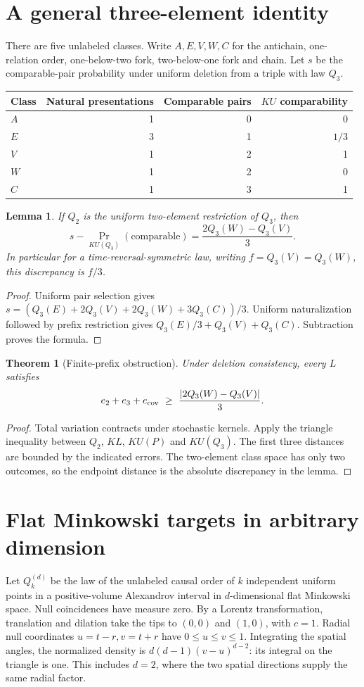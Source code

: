 \documentclass[11pt]{article}
\newtheorem{theorem}{Theorem}
\newtheorem{lemma}{Lemma}
\begin{document}
\section{A general three-element identity}
There are five unlabeled classes. Write $A,E,V,W,C$ for the antichain, one-relation order, one-below-two fork, two-below-one fork and chain. Let $s$ be the comparable-pair probability under uniform deletion from a triple with law $Q_3$.
\begin{center}
\begin{tabular}{lrrr}
\toprule
Class & Natural presentations & Comparable pairs & $K U$ comparability\\
\midrule
$A$ &1&0&0\\
$E$ &3&1&$1/3$\\
$V$ &1&2&1\\
$W$ &1&2&0\\
$C$ &1&3&1\\
\bottomrule
\end{tabular}
\end{center}
\begin{lemma}
If $Q_2$ is the uniform two-element restriction of $Q_3$, then
\[
s-\Pr_{KU(Q_3)}(\text{comparable})=\frac{2Q_3(W)-Q_3(V)}3.
\]
In particular for a time-reversal-symmetric law, writing $f=Q_3(V)=Q_3(W)$, this discrepancy is $f/3$.
\end{lemma}
\begin{proof}
Uniform pair selection gives $s=(Q_3(E)+2Q_3(V)+2Q_3(W)+3Q_3(C))/3$. Uniform naturalization followed by prefix restriction gives $Q_3(E)/3+Q_3(V)+Q_3(C)$. Subtraction proves the formula.
\end{proof}
\begin{theorem}[Finite-prefix obstruction]
Under deletion consistency, every $L$ satisfies
\[
e_2+e_3+e_{\rm cov}\ \ge\ \frac{|2Q_3(W)-Q_3(V)|}{3}.
\]
\end{theorem}
\begin{proof}
Total variation contracts under stochastic kernels. Apply the triangle inequality between $Q_2$, $KL$, $KU(P)$ and $KU(Q_3)$. The first three distances are bounded by the indicated errors. The two-element class space has only two outcomes, so the endpoint distance is the absolute discrepancy in the lemma.
\end{proof}
\section{Flat Minkowski targets in arbitrary dimension}
Let $Q_k^{(d)}$ be the law of the unlabeled causal order of $k$ independent uniform points in a positive-volume Alexandrov interval in $d$-dimensional flat Minkowski space. Null coincidences have measure zero. By a Lorentz transformation, translation and dilation take the tips to $(0,0)$ and $(1,0)$, with $c=1$. Radial null coordinates $u=t-r,v=t+r$ have $0\le u\le v\le1$. Integrating the spatial angles, the normalized density is $d(d-1)(v-u)^{d-2}$: its integral on the triangle is one. This includes $d=2$, where the two spatial directions supply the same radial factor.
\end{document}
